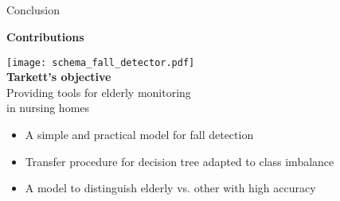 \subsection{}

\begin{frame}{Conclusion}

\centering
\centering
\textbf{Contributions}

    
\centering
\begin{minipage}[t]{0.47\linewidth}
    \vspace{0pt}
    \texttt{[image: schema\_fall\_detector.pdf]}\\
        \centering\textbf{Tarkett's objective}\\
        \smallskip
        {\textcolor{myblue}{Providing tools for elderly monitoring\\ in nursing homes}}
        \medskip
\end{minipage}\hfill
\begin{minipage}[t]{0.47\linewidth}
\begin{itemize}
    \item A simple and practical model for fall detection
    \item Transfer procedure for decision tree adapted to class imbalance
    \item A model to distinguish elderly vs. other with high accuracy
\end{itemize}
\end{minipage}


\end{frame}
